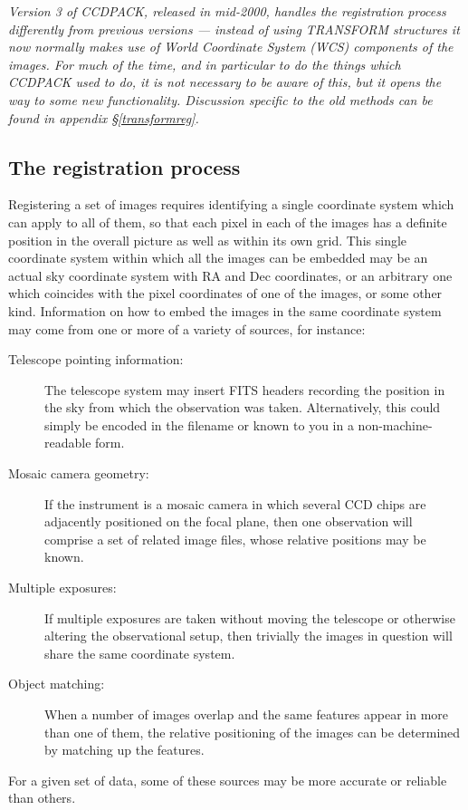 \documentclass[twoside,11pt]{article}
\newcommand{\xlabel}[1]{}
\renewcommand{\_}{\texttt{\symbol{95}}}
\begin{document}
{\em
Version 3 of CCDPACK, released in mid-2000, handles the registration process
differently from previous versions --- instead of using TRANSFORM
structures it now normally makes use of World Coordinate System
(WCS) components of the images.  For much of the time, and in particular
to do the things which CCDPACK used to do, it is not 
necessary to be aware of this, but it opens the way to some new
functionality.
Discussion specific to the old methods can be found in 
appendix \S\ref{transformreg}.
}


\subsection{\xlabel{registrationprocess}\label{regproc}The registration process}

Registering a set of images requires identifying a single 
coordinate system which can apply to all of them, so that 
each pixel in each of the images has a definite position in 
the overall picture as well as within its own grid.
This single coordinate system within which all the images can
be embedded may be an actual sky coordinate system with RA and
Dec coordinates, or an arbitrary one which coincides with the
pixel coordinates of one of the images, or some other kind.
Information on how to embed the images in the same coordinate
system may come from one or more of a variety of sources, 
for instance:
\begin{description}
\item[Telescope pointing information:]
The telescope system may insert FITS headers recording the
position in the sky from which the observation was taken.
Alternatively, this could simply be encoded in the filename or
known to you in a non-machine-readable form.
\item[Mosaic camera geometry:]
If the instrument is a mosaic camera in which several CCD chips
are adjacently positioned on the focal plane,
then one observation will comprise a set of related image files,
whose relative positions may be known.
\item[Multiple exposures:]
If multiple exposures are taken without moving the telescope
or otherwise altering the observational setup,
then trivially the images in question will share the same coordinate
system.
\item[Object matching:]
When a number of images overlap and the same features
appear in more than one of them, the relative positioning
of the images can be determined by matching up the features.
\end{description}
For a given set of data,
some of these sources may be more accurate or reliable than others.
\end{document}
